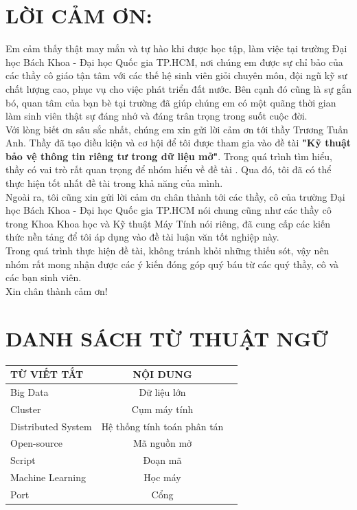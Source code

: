 \documentclass[11pt,a4paper]{article}
\begin{document}
\newpage
\section{LỜI CẢM ƠN:}
Em cảm thấy thật may mắn và tự hào khi được học tập, làm việc tại trường Đại học Bách Khoa - Đại học Quốc gia TP.HCM, nơi chúng em được sự chỉ bảo của các thầy cô giáo tận tâm với các thế hệ sinh viên giỏi chuyên môn, đội ngũ kỹ sư chất lượng cao, phục vụ cho việc phát triển đất nước. Bên cạnh đó cũng là sự gắn bó, quan tâm của bạn bè tại trường đã giúp chúng em có một quãng thời gian làm sinh viên thật sự đáng nhớ và đáng trân trọng trong suốt cuộc đời.\\[0.2cm]
Với lòng biết ơn sâu sắc nhất, chúng em xin gửi lời cảm ơn tới thầy Trương Tuấn Anh. Thầy đã tạo điều kiện và cơ hội để tôi được tham gia vào đề tài \textbf{"Kỹ thuật bảo vệ thông tin riêng tư trong dữ liệu mở"}. Trong quá trình tìm hiểu, thầy có vai trò rất quan trọng để nhóm hiểu về đề tài . Qua đó, tôi đã có thể thực hiện tốt nhất đề tài trong khả năng của mình.\\[0.2cm]
Ngoài ra, tôi cũng xin gửi lời cảm ơn chân thành tới các thầy, cô của trường Đại học Bách Khoa - Đại học Quốc gia TP.HCM nói chung cũng như các thầy cô trong Khoa Khoa học và Kỹ thuật Máy Tính nói riêng, đã cung cấp các kiến thức nền tảng để tôi áp dụng vào đề tài luận văn tốt nghiệp này.\\[0.2cm]
Trong quá trình thực hiện đề tài, không tránh khỏi những thiếu sót, vậy nên nhóm rất mong nhận được các ý kiến đóng góp quý báu từ các quý thầy, cô và các bạn sinh viên.\\[0.2cm]
\hspace*{\fill} Xin chân thành cảm ơn!


\newpage
\tableofcontents


\newpage
\section{DANH SÁCH TỪ THUẬT NGỮ}
\begin{tabular}{|l|c|r|}
    \hline
    TỪ VIẾT TẮT & NỘI DUNG \\
    \hline
    Big Data & Dữ liệu lớn \\
    Cluster & Cụm máy tính \\
    Distributed System & Hệ thống tính toán phân tán \\
    Open-source & Mã nguồn mở \\
    Script & Đoạn mã \\
    Machine Learning & Học máy \\
    Port & Cổng \\
    
    
    \hline
\end{tabular}
\end{document}
